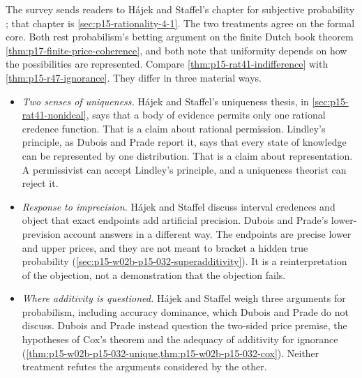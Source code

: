 The survey sends readers to H\'ajek and Staffel's chapter for subjective
probability \cite[p.~306]{DuboisPrade2021RepresentingBelief}; that chapter
is \cref{sec:p15-rationality-4-1}. The two treatments agree on the formal
core. Both rest probabilism's betting argument on the finite Dutch book
theorem \cref{thm:p17-finite-price-coherence}, and both note that
uniformity depends on how the possibilities are represented. Compare
\cref{thm:p15-rat41-indifference} with \cref{thm:p15-r47-ignorance}. They
differ in three material ways.
\begin{itemize}
\item \emph{Two senses of uniqueness.} H\'ajek and Staffel's uniqueness
  thesis, in \cref{sec:p15-rat41-nonideal}, says that a body of evidence
  permits only one rational credence function. That is a claim about
  rational permission. Lindley's principle, as Dubois and Prade report it,
  says that every state of knowledge can be represented by one
  distribution. That is a claim about representation. A permissivist can
  accept Lindley's principle, and a uniqueness theorist can reject it.
\item \emph{Response to imprecision.} H\'ajek and Staffel discuss interval
  credences and object that exact endpoints add artificial precision.
  Dubois and Prade's lower-prevision account answers in a different way.
  The endpoints are precise lower and upper prices, and they are not meant
  to bracket a hidden true probability
  (\cref{sec:p15-w02b-p15-032-superadditivity}). It is a reinterpretation
  of the objection, not a demonstration that the objection fails.
\item \emph{Where additivity is questioned.} H\'ajek and Staffel weigh
  three arguments for probabilism, including accuracy dominance, which
  Dubois and Prade do not discuss. Dubois and Prade instead question the
  two-sided price premise, the hypotheses of Cox's theorem and the
  adequacy of additivity for ignorance
  (\cref{thm:p15-w02b-p15-032-unique,thm:p15-w02b-p15-032-cox}). Neither
  treatment refutes the arguments considered by the other.
\end{itemize}

